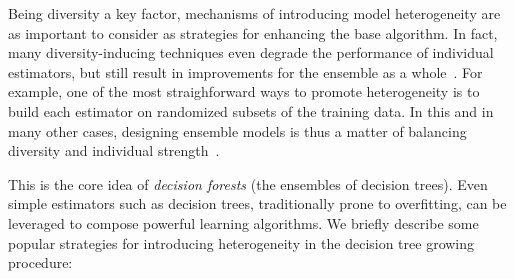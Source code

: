 Being diversity a key factor,
mechanisms of introducing model heterogeneity are as important to consider as strategies for enhancing the base algorithm.
%
In fact, many diversity-inducing techniques even degrade the performance of individual estimators, but still result in improvements for the ensemble as a whole~\cite{breiman2001random,geurts2006extremely}.
For example, one of the most straighforward ways to promote heterogeneity is to build each estimator on randomized subsets of the training data.
In this and in many other cases, designing ensemble models is thus a matter of balancing diversity and individual strength~\cite{breiman2001random}.


%

This is the core idea of \emph{decision forests} (the ensembles of decision trees). Even simple estimators such as decision trees, traditionally prone to overfitting, can be leveraged to compose powerful learning algorithms.
%
We briefly describe some popular strategies for introducing heterogeneity in the decision tree growing procedure:

